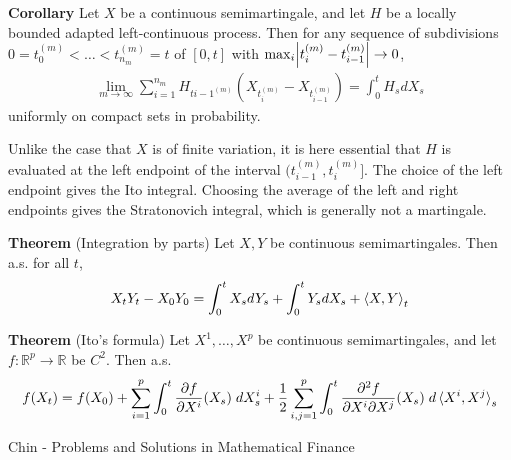 \documentclass[hidelinks, 12pt]{article}
\theoremstyle{mydefstyle}
\theoremstyle{mythmstyle}
\begin{document}
\textbf{Corollary} Let $X$ be a continuous semimartingale, and let $H$ be a locally bounded adapted left-continuous process. Then for any sequence of subdivisions $0 = t_0^{(m)} < \dots < t_{n_m}^{(m)} = t$ of $[0, t]$ with $\max_i \abs{t_i^{(m)} - t_{i-1}^{(m)}} \to 0$,
\begin{gather*}
\lim_{m \to \infty} \sum_{i = 1}^{n_m} H_{t{i-1}^{(m)}} \left( X_{t_i^{(m)}} - X_{t_{i-1}^{(m)}} \right) = \int_0^t H_s dX_s
\end{gather*}
uniformly on compact sets in probability. 

Unlike the case that $X$ is of finite variation, it is here essential that $H$ is evaluated at the left endpoint of the interval $(t_{i-1}^{(m)}, t_i^{(m)}]$. The choice of the left endpoint gives the Ito integral. Choosing the average of the left and right endpoints gives the Stratonovich integral, which is generally not a martingale. 

\textbf{Theorem} (Integration by parts) Let $X, Y$ be continuous semimartingales. Then a.s. for all $t$,
\begin{gather*}
X_t Y_t - X_0 Y_0 = \int_0^t X_s dY_s + \int_0^t Y_s dX_s + \braket{X, Y}_t
\end{gather*}

\textbf{Theorem} (Ito's formula) Let $X^1, \dots, X^p$ be continuous semimartingales, and let $f : \mathbb{R}^p \to \mathbb{R}$ be $C^2$. Then a.s.
\begin{gather*}
f(X_t) = f(X_0) + \sum_{i = 1}^p \int_0^t \frac{\partial f}{\partial X^i}(X_s) \hspace{1mm} dX^i_s + \frac{1}{2} \sum_{i, j = 1}^p \int_0^t \frac{\partial^2 f}{\partial X^i \partial X^j}(X_s) \hspace{1mm} d\braket{X^i, X^j}_s
\end{gather*}

\newpage

Chin - Problems and Solutions in Mathematical Finance
\end{document}
